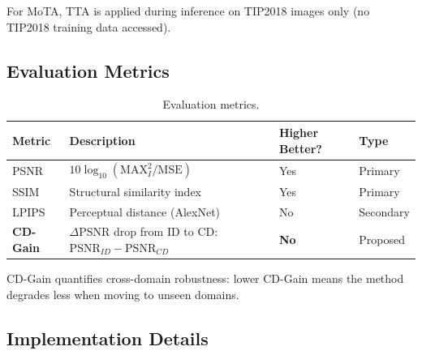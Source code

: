 \documentclass[review,10pt]{elsarticle}
\begin{document}
For MoTA, TTA is applied during inference on TIP2018 images only (no TIP2018 training data accessed).

\subsection{Evaluation Metrics}

\begin{table}[tb]
\centering
\footnotesize
\caption{Evaluation metrics.}
\label{tab:metrics}
\setlength{\tabcolsep}{3pt}
\begin{tabular}{@{}p{1.3cm}p{3.4cm}p{1.5cm}p{1.2cm}@{}}
\toprule
Metric & Description & Higher Better? & Type \\
\midrule
PSNR & $10 \log_{10}(\text{MAX}_I^2 / \text{MSE})$ & Yes & Primary \\
SSIM \cite{wang2004ssim} & Structural similarity index & Yes & Primary \\
LPIPS \cite{zhang2018perceptual} & Perceptual distance (AlexNet) & No & Secondary \\
\textbf{CD-Gain} & $\Delta$PSNR drop from ID to CD: $\text{PSNR}_{ID} - \text{PSNR}_{CD}$ & \textbf{No} & Proposed \\
\bottomrule
\end{tabular}
\end{table}

CD-Gain quantifies cross-domain robustness: lower CD-Gain means the method degrades less when moving to unseen domains.

\subsection{Implementation Details}
\end{document}
